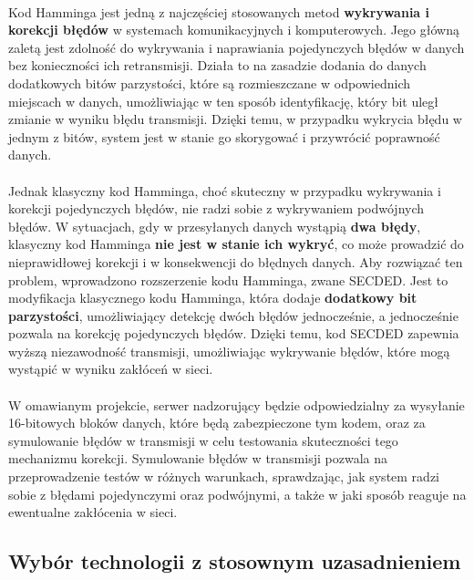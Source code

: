 \paragraph{} Kod Hamminga jest jedną z najczęściej stosowanych metod \textbf{wykrywania i korekcji błędów} w systemach komunikacyjnych i komputerowych. Jego główną zaletą jest zdolność do wykrywania i naprawiania pojedynczych błędów w danych bez konieczności ich retransmisji. Działa to na zasadzie dodania do danych dodatkowych bitów parzystości, które są rozmieszczane w odpowiednich miejscach w danych, umożliwiając w ten sposób identyfikację, który bit uległ zmianie w wyniku błędu transmisji. Dzięki temu, w przypadku wykrycia błędu w jednym z bitów, system jest w stanie go skorygować i przywrócić poprawność danych.

\paragraph{} Jednak klasyczny kod Hamminga, choć skuteczny w przypadku wykrywania i korekcji pojedynczych błędów, nie radzi sobie z wykrywaniem podwójnych błędów. W sytuacjach, gdy w przesyłanych danych wystąpią \textbf{dwa błędy}, klasyczny kod Hamminga \textbf{nie jest w stanie ich wykryć}, co może prowadzić do nieprawidłowej korekcji i w konsekwencji do błędnych danych. Aby rozwiązać ten problem, wprowadzono rozszerzenie kodu Hamminga, zwane SECDED. Jest to modyfikacja klasycznego kodu Hamminga, która dodaje \textbf{dodatkowy bit parzystości}, umożliwiający detekcję dwóch błędów jednocześnie, a jednocześnie pozwala na korekcję pojedynczych błędów. Dzięki temu, kod SECDED zapewnia wyższą niezawodność transmisji, umożliwiając wykrywanie błędów, które mogą wystąpić w wyniku zakłóceń w sieci.

\paragraph{} W omawianym projekcie, serwer nadzorujący będzie odpowiedzialny za wysyłanie 16-bitowych bloków danych, które będą zabezpieczone tym kodem, oraz za symulowanie błędów w transmisji w celu testowania skuteczności tego mechanizmu korekcji. Symulowanie błędów w transmisji pozwala na przeprowadzenie testów w różnych warunkach, sprawdzając, jak system radzi sobie z błędami pojedynczymi oraz podwójnymi, a także w jaki sposób reaguje na ewentualne zakłócenia w sieci.

\subsection{Wybór technologii z stosownym uzasadnieniem}

